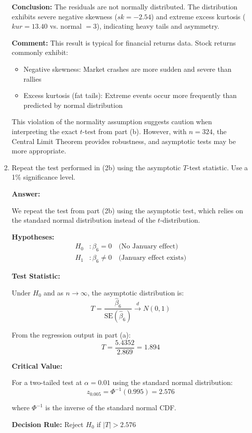 \documentclass[12pt,a4paper]{article}
\begin{document}
\begin{enumerate}[label=(\alph*)]
\textbf{Conclusion:} The residuals are not normally distributed. The distribution exhibits severe negative skewness ($sk = -2.54$) and extreme excess kurtosis ($kur = 13.40$ vs. normal $= 3$), indicating heavy tails and asymmetry.

\textbf{Comment:} This result is typical for financial returns data. Stock returns commonly exhibit:
\begin{itemize}
\item Negative skewness: Market crashes are more sudden and severe than rallies
\item Excess kurtosis (fat tails): Extreme events occur more frequently than predicted by normal distribution
\end{itemize}

This violation of the normality assumption suggests caution when interpreting the exact $t$-test from part (b). However, with $n=324$, the Central Limit Theorem provides robustness, and asymptotic tests may be more appropriate.
  
  \item Repeat the test performed in (2b) using the asymptotic $T$-test statistic. Use a 1\% significance level.
  
  \textbf{Answer:} 

We repeat the test from part (2b) using the asymptotic test, 
which relies on the standard normal distribution instead of 
the $t$-distribution.

\textbf{Hypotheses:}
\begin{align*}
H_0&: \beta_6 = 0 \quad \text{(No January effect)} \\
H_1&: \beta_6 \neq 0 \quad \text{(January effect exists)}
\end{align*}

\textbf{Test Statistic:}

Under $H_0$ and as $n \to \infty$, the asymptotic distribution is:
$$T = \frac{\hat{\beta}_6}{\text{SE}(\hat{\beta}_6)} 
\xrightarrow{d} N(0,1)$$

From the regression output in part (a):
$$T = \frac{5.4352}{2.869} = 1.894$$

\textbf{Critical Value:}

For a two-tailed test at $\alpha = 0.01$ using the standard 
normal distribution:
$$z_{0.005} = \Phi^{-1}(0.995) = 2.576$$

where $\Phi^{-1}$ is the inverse of the standard normal CDF.

\textbf{Decision Rule:} Reject $H_0$ if $|T| > 2.576$


\end{enumerate}
\end{document}
